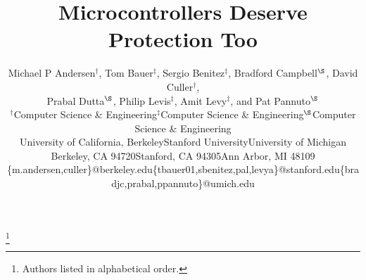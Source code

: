 \documentclass[letterpaper,twocolumn,10pt]{article}
\begin{document}
\date{}

\title{\Large \bf Microcontrollers Deserve Protection Too}

\author{
\begin{tabular}{ccc}
  \multicolumn{3}{c}{
    Michael P Andersen$^\dagger$,
    Tom Bauer$^\ddagger$,
    Sergio Benitez$^\ddagger$,
    Bradford Campbell$^\S$,
    David Culler$^\dagger$,
  } \\
  \multicolumn{3}{c}{
    Prabal Dutta$^\S$,
    Philip Levis$^\ddagger$,
    Amit Levy$^\ddagger$,
    and
    Pat Pannuto$^\S$
    \vspace{0.3cm}
  } \\
  \small{$^\dagger$Computer Science \& Engineering} &
  \small{$^\ddagger$Computer Science \& Engineering} &
  \small{$^\S$Computer Science \& Engineering} \\
  \small{University of California, Berkeley} &
  \small{Stanford University} &
  \small{University of Michigan} \\
  \small{Berkeley, CA 94720} &
  \small{Stanford, CA 94305} &
  \small{Ann Arbor, MI 48109} \\
  \small{\{m.andersen,culler\}@berkeley.edu} &
  \small{\{tbauer01,sbenitez,pal,levya\}@stanford.edu} &
  \small{\{bradjc,prabal,ppannuto\}@umich.edu} \\
\end{tabular}
}

\maketitle

\let\thefootnote\relax\footnote{Authors listed in alphabetical order.}


\begin{abstract}

\end{abstract}






%
%
%

{\footnotesize 
}


\theendnotes
\end{document}
